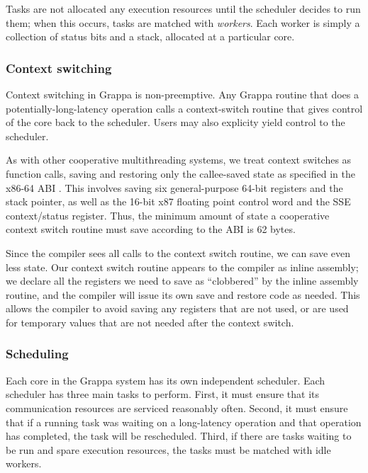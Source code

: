 Tasks are not allocated any execution resources until the scheduler
decides to run them; when this occurs, tasks are matched with {\em
  workers}. Each worker is simply a collection of status bits and a
stack, allocated at a particular core.


\subsubsection{Context switching}

Context switching in Grappa is non-preemptive. Any Grappa routine that
does a potentially-long-latency operation calls a context-switch
routine that gives control of the core back to the scheduler. Users
may also explicity yield control to the scheduler.

As with other cooperative multithreading systems, we treat context
switches as function calls, saving and restoring only the callee-saved
state as specified in the x86-64 ABI . This involves saving
six general-purpose 64-bit registers and the stack pointer, as well as
the 16-bit x87 floating point control word and the SSE context/status
register. Thus, the minimum amount of state a cooperative context
switch routine must save according to the ABI is 62 bytes.

Since the compiler sees all calls to the context switch routine, we
can save even less state. Our context switch routine appears to the
compiler as inline assembly; we declare all the registers we need
to save as ``clobbered'' by the inline assembly routine, and the
compiler will issue its own save and restore code as needed. This allows the
compiler to avoid saving any registers that are not used, or are used
for temporary values that are not needed after the context switch.

\subsubsection{Scheduling}

Each core in the Grappa system has its own independent scheduler. Each
scheduler has three main tasks to perform.  First, it must ensure that
its communication resources are serviced reasonably often. Second, it
must ensure that if a running task was waiting on a long-latency
operation and that operation has completed, the task will be
rescheduled. Third, if there are tasks waiting to be run and spare
execution resources, the tasks must be matched with idle workers.

